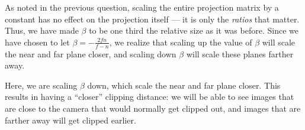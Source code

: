 \documentclass[11pt]{tingpset}
\begin{document}

    As noted in the previous question, scaling the entire projection matrix by a constant has no effect on the projection itself --- it is only the \emph{ratios} that matter. Thus, we have made $\beta$ to be one third the relative size as it was before. Since we have chosen to let $\beta = -\frac{2fn}{f-n}$, we realize that scaling up the value of $\beta$ will scale the near and far plane closer, and scaling down $\beta$ will scale these planes farther away.

    Here, we are scaling $\beta$ down, which scale the near and far plane closer. This results in having a ``closer'' clipping distance: we will be able to see images that are close to the camera that would normally get clipped out, and images that are farther away will get clipped earlier.





  \todo


  \todo


  \todo
\end{document}
